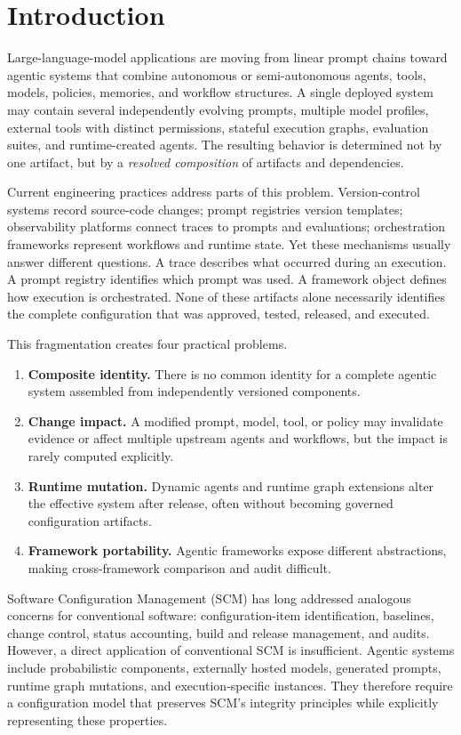\documentclass[10pt]{article}
\begin{document}
\section{Introduction}

Large-language-model applications are moving from linear prompt chains toward agentic systems that combine autonomous or semi-autonomous agents, tools, models, policies, memories, and workflow structures. A single deployed system may contain several independently evolving prompts, multiple model profiles, external tools with distinct permissions, stateful execution graphs, evaluation suites, and runtime-created agents. The resulting behavior is determined not by one artifact, but by a \emph{resolved composition} of artifacts and dependencies.

Current engineering practices address parts of this problem. Version-control systems record source-code changes; prompt registries version templates; observability platforms connect traces to prompts and evaluations; orchestration frameworks represent workflows and runtime state. Yet these mechanisms usually answer different questions. A trace describes what occurred during an execution. A prompt registry identifies which prompt was used. A framework object defines how execution is orchestrated. None of these artifacts alone necessarily identifies the complete configuration that was approved, tested, released, and executed.

This fragmentation creates four practical problems.

\begin{enumerate}[leftmargin=*]
  \item \textbf{Composite identity.} There is no common identity for a complete agentic system assembled from independently versioned components.
  \item \textbf{Change impact.} A modified prompt, model, tool, or policy may invalidate evidence or affect multiple upstream agents and workflows, but the impact is rarely computed explicitly.
  \item \textbf{Runtime mutation.} Dynamic agents and runtime graph extensions alter the effective system after release, often without becoming governed configuration artifacts.
  \item \textbf{Framework portability.} Agentic frameworks expose different abstractions, making cross-framework comparison and audit difficult.
\end{enumerate}

Software Configuration Management (SCM) has long addressed analogous concerns for conventional software: configuration-item identification, baselines, change control, status accounting, build and release management, and audits. However, a direct application of conventional SCM is insufficient. Agentic systems include probabilistic components, externally hosted models, generated prompts, runtime graph mutations, and execution-specific instances. They therefore require a configuration model that preserves SCM's integrity principles while explicitly representing these properties.
\end{document}

